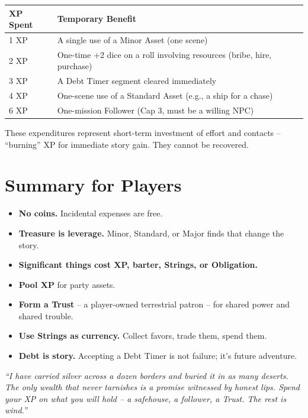 \begin{center}
\begin{tabular}{ll}
\toprule
\textbf{XP Spent} & \textbf{Temporary Benefit} \\
\midrule
1 XP & A single use of a Minor Asset (one scene) \\
2 XP & One-time +2 dice on a roll involving resources (bribe, hire, purchase) \\
3 XP & A Debt Timer segment cleared immediately \\
4 XP & One-scene use of a Standard Asset (e.g., a ship for a chase) \\
6 XP & One-mission Follower (Cap 3, must be a willing NPC) \\
\bottomrule
\end{tabular}
\end{center}

These expenditures represent short-term investment of effort and contacts -- ``burning'' XP for immediate story gain. They cannot be recovered.

\section{Summary for Players}
\label{sec:currency-summary}

\begin{itemize}
  \item \textbf{No coins.} Incidental expenses are free.
  \item \textbf{Treasure is leverage.} Minor, Standard, or Major finds that change the story.
  \item \textbf{Significant things cost XP, barter, Strings, or Obligation.}
  \item \textbf{Pool XP} for party assets.
  \item \textbf{Form a Trust} -- a player-owned terrestrial patron -- for shared power and shared trouble.
  \item \textbf{Use Strings as currency.} Collect favors, trade them, spend them.
  \item \textbf{Debt is story.} Accepting a Debt Timer is not failure; it's future adventure.
\end{itemize}

\begin{tcolorbox}[colback=green!5!white,colframe=green!70!black,title=The Gray Wanderer's Ledger,breakable]
\emph{``I have carried silver across a dozen borders and buried it in as many deserts. The only wealth that never tarnishes is a promise witnessed by honest lips. Spend your XP on what you will hold -- a safehouse, a follower, a Trust. The rest is wind.''}
\end{tcolorbox}
